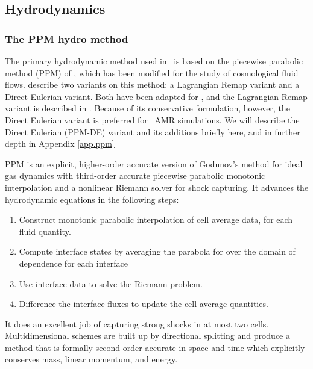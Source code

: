 \subsection{Hydrodynamics}\label{sec.ov.hydro}

\subsubsection{The PPM hydro method}\label{sec.ov.hydro.ppm}


The primary hydrodynamic method used in \enzo\ is based on the
piecewise parabolic method (PPM) of
\citet{1984JCoPh..54..174C}, which has been
modified for the study of cosmological fluid flows.  
\citet{1984JCoPh..54..174C} describe two variants on this method: a
Lagrangian Remap variant and a Direct Eulerian variant.  Both have
been adapted for \enzo, and the Lagrangian Remap 
variant is described in \citet{1995CoPhC..89..149B}.  Because of its
conservative formulation, however, the Direct Eulerian variant is
preferred for \enzo\ AMR simulations.  We will describe the Direct
Eulerian (PPM-DE) variant and its additions briefly here, and in
further depth in Appendix \ref{app.ppm} 


PPM is an explicit, higher-order accurate version of
Godunov's method for ideal gas dynamics with third-order accurate piecewise parabolic
monotonic interpolation and a nonlinear Riemann solver for shock
capturing.  It advances the hydrodynamic equations in the following
steps:
\begin{enumerate}
 \item Construct monotonic parabolic interpolation of cell average
 data, for each fluid quantity.
 \item Compute interface states by averaging the parabola for over the domain of dependence for
 each interface
 \item Use interface data to solve the Riemann problem.
 \item Difference the interface fluxes to update the cell average quantities.
\end{enumerate}
It does an excellent job of capturing strong shocks in at
most two cells.  Multidimensional schemes are built up by directional
splitting and produce a method that is formally second-order accurate
in space and time which explicitly conserves mass, linear momentum, and energy.  

